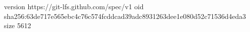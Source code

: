 version https://git-lfs.github.com/spec/v1
oid sha256:63de717e565ebc4c76c574fcddcad39adc8931263dee1e080d52c71536d4eda3
size 5612
